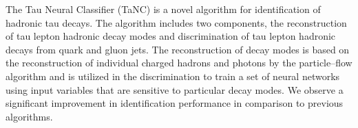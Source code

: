 The Tau Neural Classifier (TaNC) is a novel algorithm for identification of
hadronic tau decays.  The algorithm includes two components, the reconstruction
of tau lepton hadronic decay modes and discrimination of tau lepton hadronic
decays from quark and gluon jets.  The reconstruction of decay modes is based
on the reconstruction of individual charged hadrons and photons by the
particle--flow algorithm and is utilized in the discrimination to train a set
of neural networks using input variables that are sensitive to particular decay
modes.  We observe a significant improvement in identification performance in
comparison to previous algorithms.  
